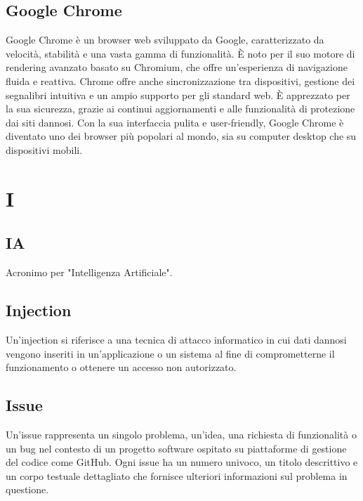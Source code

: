 \documentclass{article}
\begin{document}
\subsection{Google Chrome}
Google Chrome è un browser web sviluppato da Google, caratterizzato da velocità, stabilità e una vasta gamma di funzionalità. È noto per il suo motore di rendering avanzato basato su Chromium, che offre un'esperienza di navigazione fluida e reattiva. Chrome offre anche sincronizzazione tra dispositivi, gestione dei segnalibri intuitiva e un ampio supporto per gli standard web. È apprezzato per la sua sicurezza, grazie ai continui aggiornamenti e alle funzionalità di protezione dai siti dannosi. Con la sua interfaccia pulita e user-friendly, Google Chrome è diventato uno dei browser più popolari al mondo, sia su computer desktop che su dispositivi mobili.

\section{I}
\subsection{IA}
Acronimo per "Intelligenza Artificiale".

\subsection{Injection}
Un'injection si riferisce a una tecnica di attacco informatico in cui dati dannosi vengono inseriti in un'applicazione o un sistema al fine di comprometterne il funzionamento o ottenere un accesso non autorizzato.

\subsection{Issue}
Un'issue rappresenta un singolo problema, un'idea, una richiesta di funzionalità o un bug nel contesto di un progetto software ospitato su piattaforme di gestione del codice come GitHub. Ogni issue ha un numero univoco, un titolo descrittivo e un corpo testuale dettagliato che fornisce ulteriori informazioni sul problema in questione.
\end{document}
